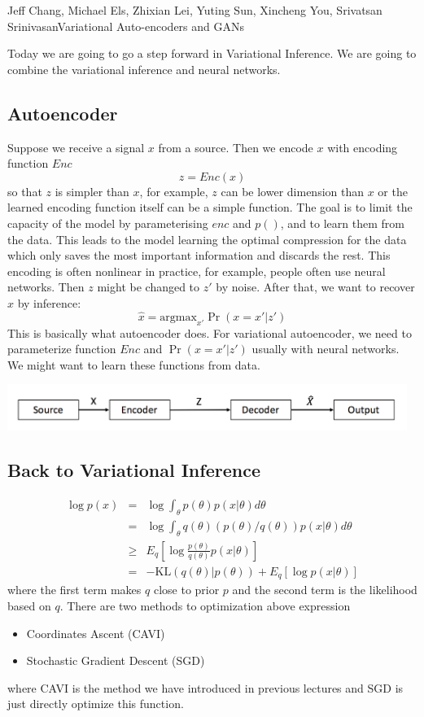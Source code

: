 \documentclass{article}
\begin{document}
 {Jeff Chang, Michael Els, Zhixian Lei, Yuting Sun, Xincheng You, Srivatsan Srinivasan}{Variational Auto-encoders and GANs}%

Today we are going to go a step forward in Variational Inference. We are going to combine the variational inference and neural networks. 
\subsection{Autoencoder}
Suppose we receive a signal $x$ from a source. Then we encode $x$ with encoding function $Enc$
$$ z = Enc(x) $$
so that $z$ is simpler than $x$, for example, $z$ can be lower dimension than $x$ or the learned encoding function itself can be a simple function. The goal is to limit the capacity of the model by parameterising $enc$ and $p()$, and to learn them from the data. This leads to the model learning the optimal compression for the data which only saves the most important information and discards the rest. This encoding is often nonlinear in practice, for example, people often use neural networks. Then $z$ might be changed to $z'$ by noise. After that, we want to recover $x$ by inference:
$$ \hat{x} = \textrm{argmax}_{x'}\Pr(x = x'|z') $$
This is basically what autoencoder does. For variational autoencoder, we need to parameterize function $Enc$ and $\Pr(x = x'|z')$ usually with neural networks. We might want to learn these functions from data. \\
\centerline{\includegraphics[width=13cm]{chart.png}}
\subsection{Back to Variational Inference}
\begin{eqnarray}
\log p(x) & = &\log \int_{\theta} p(\theta)p(x | \theta)d\theta \\
& = & \log \int_{\theta}q(\theta)(p(\theta)/q(\theta))p(x|\theta)d\theta \\
& \geq & E_q\left[\log \frac{p(\theta)}{q(\theta)}p(x|\theta)\right] \\
& = & -\textrm{KL}(q(\theta)|p(\theta)) + E_q[\log p(x|\theta)]
\end{eqnarray}
where the first term makes $q$ close to prior $p$ and the second term is the likelihood based on $q$.
There are two methods to optimization above expression
\begin{itemize}
\item Coordinates Ascent (CAVI)
\item Stochastic Gradient Descent (SGD)
\end{itemize}
where CAVI is the method we have introduced in previous lectures and SGD is just directly optimize this function.
\end{document}
